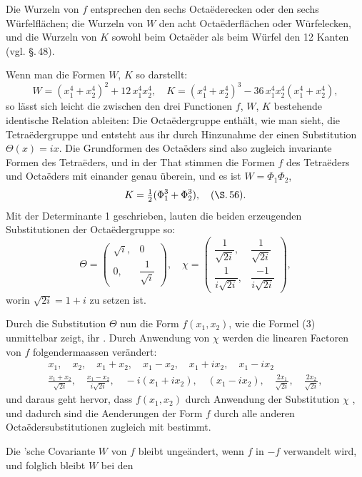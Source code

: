 
Die Wurzeln von $f$ entsprechen den sechs Octaëderecken oder
den sechs Würfelflächen; die Wurzeln von $W$ den acht Octaëderflächen
oder Würfelecken, und die Wurzeln von $K$ sowohl beim Octaëder
als beim Würfel den 12 Kanten (vgl. \S.\,48).

Wenn man die Formen $W$, $K$ so darstellt:
\[
W = (x_1^4 + x_2^4)^2 + 12\,x_1^4x_2^4, \quad K = (x_1^4 + x_2^4)^3 - 36\,x_1^4x_2^4(x_1^4 + x_2^4),
\]
so lässt sich leicht die zwischen den drei Functionen $f$, $W$, $K$
bestehende identische Relation ableiten:
Die Octaëdergruppe enthält, wie man sieht, die Tetraëdergruppe
und entsteht aus ihr durch Hinzunahme der einen Substitution
 $\Theta(x) = ix$. Die Grundformen des Octaëders sind also
zugleich invariante Formen des Tetraëders, und in der That
stimmen die Formen $f$ des Tetraëders und Octaëders mit einander
 genau überein, und es ist $W = \Phi_1\Phi_2$,
\[
K = \tfrac{1}{2}(\Phi_1^3 + \Phi_2^3), \quad (\S.\,56).
\]
Mit der Determinante 1 geschrieben, lauten die beiden erzeugenden
 Substitutionen der Octaëdergruppe so:
\[
\Theta = \begin{pmatrix} \sqrt{i}, & 0 \\ 0, & \dfrac{1}{\sqrt{i}} \end{pmatrix}, \quad
\chi = \begin{pmatrix} \dfrac{1}{\sqrt{2i}}, & \dfrac{1}{\sqrt{2i}} \\[6pt] \dfrac{1}{i\sqrt{2i}}, & \dfrac{-1}{i\sqrt{2i}} \end{pmatrix},
\]
worin $\sqrt{2i} = 1 + i$ zu setzen ist.

Durch die Substitution $\Theta$  nun die Form $f(x_1, x_2)$,
wie die Formel (3) unmittelbar zeigt, ihr . Durch
Anwendung von $\chi$ werden die linearen Factoren von $f$ folgendermaassen
 verändert:
\[
\begin{gathered}
x_1, \quad x_2, \quad x_1 + x_2, \quad x_1 - x_2, \quad x_1 + ix_2, \quad x_1 - ix_2 \\
\frac{x_1 + x_2}{\sqrt{2i}}, \quad \frac{x_1 - x_2}{i\sqrt{2i}}, \quad -i(x_1 + ix_2), \quad (x_1 - ix_2), \quad \frac{2x_1}{\sqrt{2i}}, \quad \frac{2x_2}{\sqrt{2i}},
\end{gathered}
\]
und daraus geht hervor, dass $f(x_1, x_2)$ durch Anwendung der
Substitution $\chi$ , und dadurch sind die
Aenderungen der Form $f$ durch alle anderen Octaëdersubstitutionen
 zugleich mit bestimmt.

Die 'sche Covariante $W$ von $f$ bleibt ungeändert,
wenn $f$ in $-f$ verwandelt wird, und folglich bleibt $W$ bei den
